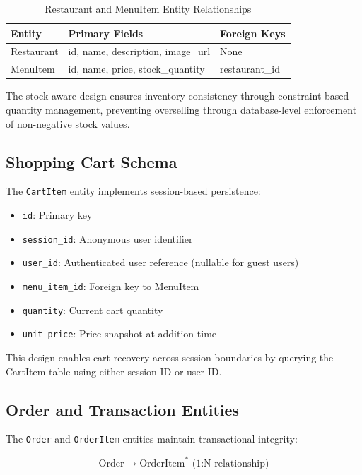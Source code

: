 \documentclass{ieeeaccess}
\begin{document}
\begin{table}[H]
\centering
\caption{Restaurant and MenuItem Entity Relationships}
\begin{tabular}{lll}
\toprule
\textbf{Entity} & \textbf{Primary Fields} & \textbf{Foreign Keys} \\
\midrule
Restaurant & id, name, description, image\_url & None \\
MenuItem & id, name, price, stock\_quantity & restaurant\_id \\
\bottomrule
\end{tabular}
\label{tab:restaurant_schema}
\end{table}

The stock-aware design ensures inventory consistency through constraint-based quantity management, preventing overselling through database-level enforcement of non-negative stock values.

\subsection{Shopping Cart Schema}
The \texttt{CartItem} entity implements session-based persistence:
\begin{itemize}
\item \texttt{id}: Primary key
\item \texttt{session\_id}: Anonymous user identifier
\item \texttt{user\_id}: Authenticated user reference (nullable for guest users)
\item \texttt{menu\_item\_id}: Foreign key to MenuItem
\item \texttt{quantity}: Current cart quantity
\item \texttt{unit\_price}: Price snapshot at addition time
\end{itemize}

This design enables cart recovery across session boundaries by querying the CartItem table using either session ID or user ID.

\subsection{Order and Transaction Entities}
The \texttt{Order} and \texttt{OrderItem} entities maintain transactional integrity:

\begin{equation}
\text{Order} \rightarrow \text{OrderItem}^{*} \text{ (1:N relationship)}
\label{eq:order_relationship}
\end{equation}
\end{document}
